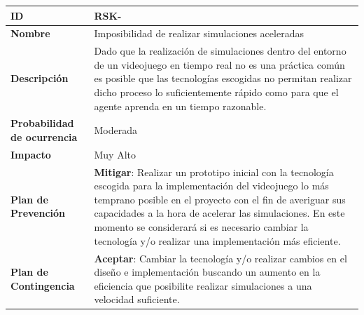 \begin{center}
	\begin{tabular}{ | p{5.6cm} | p{8.5cm} | } 
		\hline
		
		\textbf{ID} & RSK-\arabic{contador_riesgos}
		{contador_riesgos} \\
		
		\hline 
		\textbf{Nombre} &
		Imposibilidad de realizar simulaciones aceleradas\\ 
		
		\hline
		\textbf{Descripción} & 
		Dado que la realización de simulaciones dentro del entorno de un videojuego en tiempo real no es una práctica común es posible que las tecnologías escogidas no permitan realizar dicho proceso lo suficientemente rápido como para que el agente aprenda en un tiempo razonable.\\
		
		\hline 
		\textbf{Probabilidad de ocurrencia} &
		Moderada\\
		
		\hline 
		\textbf{Impacto} &
		Muy Alto\\
		
		\hline 
		\textbf{Plan de Prevención} &
		\textbf{Mitigar}: Realizar un prototipo inicial con la tecnología escogida para la implementación del videojuego lo más temprano posible en el proyecto con el fin de averiguar sus capacidades a la hora de acelerar las simulaciones. En este momento se considerará si es necesario cambiar la tecnología y/o realizar una implementación más eficiente.\\
		
		\hline 
		\textbf{Plan de Contingencia} &
		\textbf{Aceptar}: Cambiar la tecnología y/o realizar cambios en el diseño e implementación buscando un aumento en la eficiencia que posibilite realizar simulaciones a una velocidad suficiente.\\
		
		
		\hline
	\end{tabular}
\end{center}

